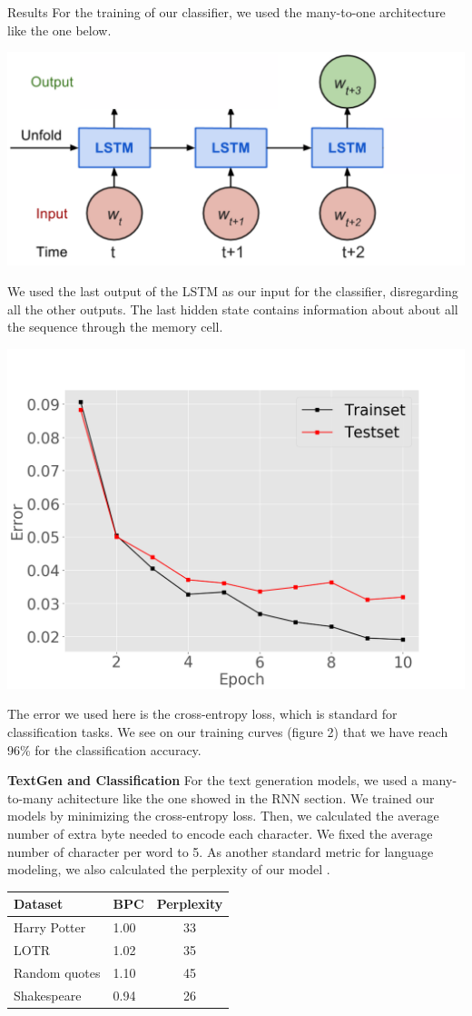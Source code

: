 \documentclass[final]{beamer}
\newlength{\colwidth}
\begin{document}
\begin{frame}[t]
\begin{columns}[t]
\begin{column}{\colwidth}
\begin{block}{Results}
For the training of our classifier, we used the many-to-one architecture like the one below.
\begin{center}
	\includegraphics[width=.65\linewidth]{manytoone}
\end{center}
We used the last output of the LSTM as our input for the classifier,
disregarding all the other outputs. The last hidden state contains information
about about all the sequence through the memory cell.  \begin{center}
	\includegraphics[width=.7\linewidth]{classerror}
\end{center}
The error we used here is the cross-entropy loss, which is standard for
classification tasks. We see on our training curves (figure 2) that we have
reach 96\% for the classification accuracy.

\textbf{TextGen and Classification}
For the text generation models, we used a many-to-many achitecture like the one
showed in the RNN section. We trained our models by minimizing the
cross-entropy loss. Then, we calculated the average number of extra byte needed
to encode each character. We fixed the average number of character per word to
5. As another standard metric for language modeling, we also calculated the
perplexity of our model \cite{gravesGenerating}.
\begin{tabular}{|l|l|c|}
\hline
Dataset & BPC & Perplexity \\
\hline
Harry Potter & 1.00 & 33 \\
LOTR & 1.02 & 35 \\
Random quotes & 1.10 & 45 \\
Shakespeare & 0.94 & 26\\
\hline
\end{tabular}


\end{block}
\end{column}
\end{columns}
\end{frame}
\end{document}
